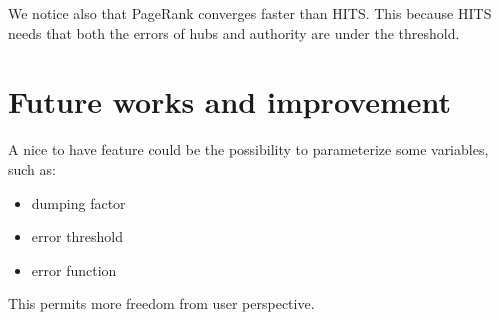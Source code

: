 \documentclass[10pt]{article}
\begin{document}
We notice also that PageRank converges faster than HITS. This because HITS needs that both the errors of hubs and authority are under the threshold.
\section{Future works and improvement}

A nice to have feature could be the possibility to parameterize some variables, such as:
\begin{itemize}
    \item dumping factor
    \item error threshold
    \item error function
\end{itemize}
This permits more freedom from user perspective.
\newpage

 
\end{document}
